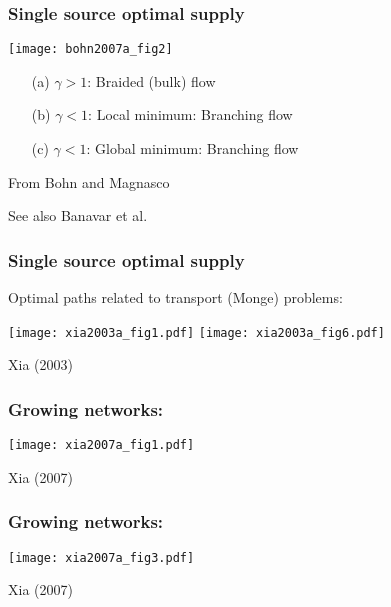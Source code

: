 \begin{frame}
  \frametitle{Single source optimal supply}

  \texttt{[image: bohn2007a\_fig2]}
  
  \begin{itemize}
  \item[(a)]
    $\gamma > 1$: \alert{Braided} (bulk) flow 
  \item[(b)]
    $\gamma < 1$:
    Local minimum: \alert{Branching} flow
  \item[(c)] 
    $\gamma < 1$:
    Global minimum: \alert{Branching} flow
    
  \end{itemize}

  \medskip
  
  {\small From Bohn and Magnasco\cite{bohn2007a}}

  {\small See also Banavar et al.\cite{banavar2000a}}

\end{frame}

\begin{frame}
  \frametitle{Single source optimal supply}

  Optimal paths related to transport (Monge) problems:

  \texttt{[image: xia2003a\_fig1.pdf]}
  \texttt{[image: xia2003a\_fig6.pdf]}

  Xia (2003)\cite{xia2003a}

\end{frame}

\begin{frame}
  \frametitle{Growing networks:}

  \begin{center}
    \texttt{[image: xia2007a\_fig1.pdf]}
  \end{center}


  Xia (2007)\cite{xia2007a}

\end{frame}

\begin{frame}
  \frametitle{Growing networks:}

  \begin{center}
    \texttt{[image: xia2007a\_fig3.pdf]}
  \end{center}


  Xia (2007)\cite{xia2007a}

\end{frame}

